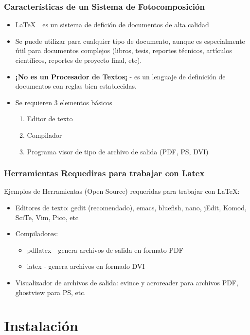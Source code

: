 \documentclass[aspectratio=169,compress]{beamer}
\begin{document}
  \frame
  {
    \frametitle{Características de un Sistema de Fotocomposición}

    \begin{itemize}
    \item \LaTeX\ \ es un sistema de defición de documentos de alta calidad
    \item Se puede utilizar para cualquier tipo de documento, aunque es especialmente útil para documentos complejos (libros, tesis, reportes técnicos, artículos científicos, reportes de proyecto final, etc).
    \item \textbf{¡No es un Procesador de Textos¡} - es un lenguaje de definición de documentos con reglas bien establecidas. 
    \item Se requieren 3 elementos básicos
	    \begin{enumerate}
		    \item Editor de texto
		    \item Compilador
		    \item Programa visor de tipo de archivo de salida (PDF, PS, DVI)
	    \end{enumerate}
    \end{itemize}
  }

  \frame
  {
    \frametitle{Herramientas Requediras para trabajar con Latex}
    Ejemplos de Herramientas (Open Source) requeridas para trabajar con \LaTeX:
    \begin{itemize}
    \item Editores de texto: gedit (recomendado), emacs, bluefish, nano, jEdit, Komod, SciTe, Vim, Pico, etc
    \item Compiladores:
	    \begin{itemize}
	    \item pdflatex - genera archivos de salida en formato PDF
	    \item latex - genera archivos en formado DVI 
	    \end{itemize}
    \item Visualizador de archivos de salida: evince y acroreader para archivos PDF, ghostview para PS, etc. 
    \end{itemize}
  }


\section{Instalación}
\end{document}
